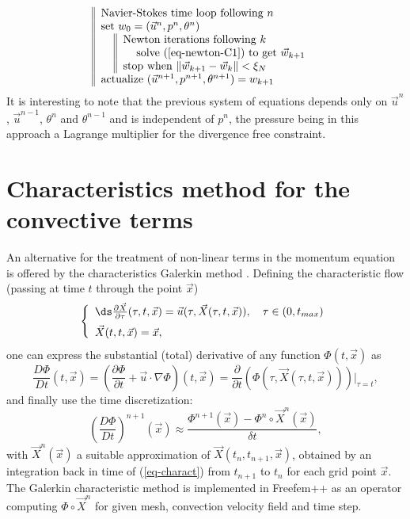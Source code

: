 \begin{equation} \label{eq-Newton-algo}
\begin{tabular}{||ll}
\multicolumn{2}{||l}{Navier-Stokes time loop following $n$}\\
\multicolumn{2}{||l}{set  $w_0=(\vec{u}^{n}, p^{n}, \theta^{n})$}\\
& \begin{tabular}[t]{||ll}
\multicolumn{2}{||l}{Newton iterations  following $k$}\\
&solve (\ref{eq-newton-C1}) to get $ \vec w_{k+1} $\\
\multicolumn{2}{||l}{stop when  $\| \vec w_{k+1} - \vec w_k \| < \xi_N$}
\end{tabular}\\
\multicolumn{2}{||l}{actualize $(\vec{u}^{n+1}, p^{n+1}, \theta^{n+1}) = w_{k+1}$}
\end{tabular}
\end{equation}
It is interesting to note that the previous system of equations depends only on $\vec{u}^n$, $\vec{u}^{n-1}$, $\theta^n$ and $\theta^{n-1}$ and is independent of $p^n$, the pressure being in this approach a Lagrange multiplier for the divergence free constraint. 

\section{Characteristics method for the convective terms}

An alternative for the treatment of non-linear terms in the momentum equation is offered by the characteristics Galerkin method \cite{Pironneau92}. Defining the characteristic flow (passing at time $t$ through the point $\vec{x}$)
\begin{equation}
\left\{
\begin{array}{l}\vspace{0.2cm}
\ds\frac{\partial \vec{X} }{\partial \tau}(\tau, t, \vec{x})=\vec{u} (\tau,\vec{X} (\tau,t, \vec{x})), \quad \tau\in (0,t_{max})\\
\vec{X} (t, t, \vec{x}) = \vec{x},
\end{array}
\right.
\label{eq-charactD}
\end{equation}
one can express the substantial (total) derivative of any function $\Phi(t,\vec{x})$ as
\begin{equation}
\frac{D\Phi}{Dt}(t,\vec{x})=\left( \frac{\partial \Phi}{\partial
	t}+\vec{u}\cdot\nabla \Phi \right)(t,\vec{x})=\frac{\partial}{\partial
	t}\left(\Phi(\tau, \vec{X}(\tau,t, \vec{x}))\right)|_{\tau=t},
\end{equation}
and finally use the time discretization:
\begin{equation}
\left(\frac{D\Phi}{Dt}\right)^{n+1}(\vec{x})\approx\frac{\Phi^{n+1}(\vec{x})-\Phi^{n}\circ \vec{X}^n(\vec{x})}{\delta t},
\end{equation}
with $\vec{X}^n(\vec{x})$ a suitable approximation of $\vec{X}(t_n,t_{n+1},\vec{x})$, obtained by an integration back in time of (\ref{eq-charact}) from $t_{n+1}$ to $t_n$ for each grid point $\vec{x}$. The Galerkin characteristic method is implemented in Freefem++ as an operator computing $\Phi \circ \vec{X}^n$ for given mesh, convection velocity field and time step.

